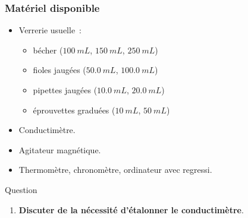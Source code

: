 \documentclass[a4paper, 11pt, final, garamond]{book}
\begin{document}
\subsubsection{Matériel disponible}
\begin{itemize}
    \item Verrerie usuelle~:\smallbreak
        \begin{minipage}{0.50\linewidth}
            \begin{itemize}
                \item bécher ($\SI{100}{mL}$, $\SI{150}{mL}$, $\SI{250}{mL}$)
                \item fioles jaugées ($\SI{50,0}{mL}$, $\SI{100,0}{mL}$)
            \end{itemize}
        \end{minipage}
        \begin{minipage}{0.50\linewidth}
            \begin{itemize}
                \item pipettes jaugées ($\SI{10,0}{mL}$, $\SI{20,0}{mL}$)
                \item éprouvettes graduées ($\SI{10}{mL}$, $\SI{50}{mL}$)
            \end{itemize}
        \end{minipage}
    \item Conductimètre.
    \item Agitateur magnétique.
    \item Thermomètre, chronomètre, ordinateur avec regressi.
\end{itemize}

\vspace{-10pt}
\begin{rexem}{\tiny Question}
    \begin{enumerate}[label=\sqenumi, start=12]
        \item \textbf{Discuter de la nécessité d'étalonner le conductimètre}.
    \end{enumerate}
\end{rexem}
\vspace{-10pt}
\end{document}
